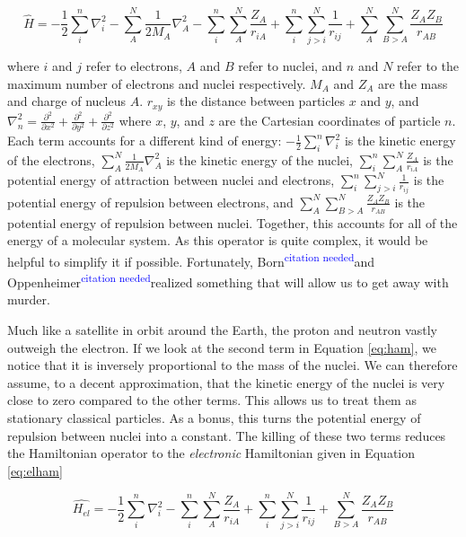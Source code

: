 \documentclass[12pt]{report}
\newcommand{\citethis}{\textsuperscript{\textcolor{blue}{citation needed}}} %
\begin{document}
\begin{equation}
\label{eq:ham}
\hat{H} = -\frac{1}{2}\sum^{n}_{i}\nabla^{2}_{i} - \sum^{N}_{A}\frac{1}{2M_{A}}\nabla^{2}_{A} - \sum^{n}_{i}\sum^{N}_{A}\frac{Z_{A}}{r_{iA}}
+ \sum^{n}_{i}\sum^{N}_{j>i}\frac{1}{r_{ij}} + \sum^{N}_{A}\sum^{N}_{B>A}\frac{Z_{A}Z_{B}}{r_{AB}}
\end{equation} 

where $i$ and $j$ refer to electrons, $A$ and $B$ refer to nuclei, and $n$ and $N$ refer to the maximum number of electrons and nuclei respectively. $M_{A}$ and $Z_{A}$ are the mass and charge of nucleus $A$. $r_{xy}$ is the distance between particles $x$ and $y$, and $\nabla^{2}_{n}=\frac{\partial^{2}}{\partial x^{2}}+\frac{\partial^{2}}{\partial y^{2}}+\frac{\partial^{2}}{\partial z^{2}}$ where $x$, $y$, and $z$ are the Cartesian coordinates of particle $n$. Each term accounts for a different kind of energy: $-\frac{1}{2}\sum^{n}_{i}\nabla^{2}_{i}$ is the kinetic energy of the electrons, $\sum^{N}_{A}\frac{1}{2M_{A}}\nabla^{2}_{A}$ is the kinetic energy of the nuclei, $\sum^{n}_{i}\sum^{N}_{A}\frac{Z_{A}}{r_{iA}}$ is the potential energy of attraction between nuclei and electrons, $\sum^{n}_{i}\sum^{N}_{j>i}\frac{1}{r_{ij}} $ is the potential energy of repulsion between electrons, and $\sum^{N}_{A}\sum^{N}_{B>A}\frac{Z_{A}Z_{B}}{r_{AB}}$ is the potential energy of repulsion between nuclei. Together, this accounts for all of the energy of a molecular system. As this operator is quite complex, it would be helpful to simplify it if possible. Fortunately, Born\citethis and Oppenheimer\citethis realized something that will allow us to get away with murder.

Much like a satellite in orbit around the Earth, the proton and neutron vastly outweigh the electron. If we look at the second term in Equation \ref{eq:ham}, we notice that it is inversely proportional to the mass of the nuclei. We can therefore assume, to a decent approximation, that the kinetic energy of the nuclei is very close to zero compared to the other terms. This allows us to treat them as stationary classical particles. As a bonus, this turns the potential energy of repulsion between nuclei into a constant. The killing of these two terms reduces the Hamiltonian operator to the \textit{electronic} Hamiltonian given in Equation \ref{eq:elham}

\begin{equation}
\label{eq:elham}
\hat{H_{el}} = -\frac{1}{2}\sum^{n}_{i}\nabla^{2}_{i}  - \sum^{n}_{i}\sum^{N}_{A}\frac{Z_{A}}{r_{iA}} + \sum^{n}_{i}\sum^{N}_{j>i}\frac{1}{r_{ij}} + \sum^{N}_{B>A}\frac{Z_{A}Z_{B}}{r_{AB}}
\end{equation} 
\end{document}
